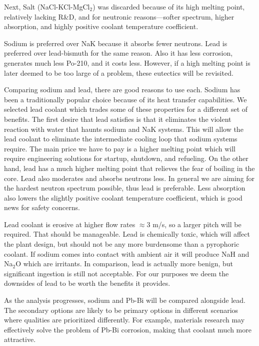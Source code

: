 \documentclass[]{report}
\begin{document}
Next, Salt (NaCl-KCl-MgCl$_2$) was discarded because of its high melting point, relatively lacking R\&D, and for neutronic reasons---softer spectrum, higher absorption, and highly positive coolant temperature coefficient.

Sodium is preferred over NaK because it absorbs fewer neutrons. Lead is preferred over lead-bismuth for the same reason. Also it has less corrosion, generates much less Po-210, and it costs less. 
However, if a high melting point is later deemed to be too large of a problem, these eutectics will be revisited.

Comparing sodium and lead, there are good reasons to use each. Sodium has been a traditionally popular choice because of its heat transfer capabilities. We selected lead coolant which trades some of these properties for a different set of benefits. 
The first desire that lead satisfies is that it eliminates the violent reaction with water that haunts sodium and NaK systems. This will allow the lead coolant to eliminate the intermediate cooling loop that sodium systems require.
The main price we have to pay is a higher melting point which will require engineering solutions for startup, shutdown, and refueling. On the other hand, lead has a much higher melting point that relieves the fear of boiling in the core.
Lead also moderates and absorbs neutrons less. In general we are aiming for the hardest neutron spectrum possible, thus lead is preferable. Less absorption also lowers the slightly positive coolant temperature coefficient, which is good news for safety concerns.

Lead coolant is erosive at higher flow rates $\approx$3 m/s, so a larger pitch will be required. That should be manageable. Lead is chemically toxic, which will affect the plant design, but should not be any more burdensome than a pyrophoric coolant. If sodium comes into contact with ambient air it will produce NaH and Na$_2$O which are irritants. In comparison, lead is actually more benign, but significant ingestion is still not acceptable.
For our purposes we deem the downsides of lead to be worth the benefits it provides.

As the analysis progresses, sodium and Pb-Bi will be compared alongside lead. The secondary options are likely to be primary options in different scenarios where qualities are prioritized differently.
For example, materials research may effectively solve the problem of Pb-Bi corrosion, making that coolant much more attractive.
 




\end{document}
